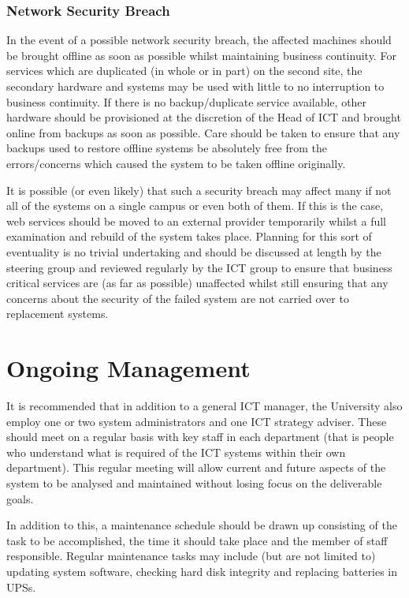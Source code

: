 \documentclass[a4paper, twoside]{article}
\begin{document}
\subsubsection{Network Security Breach}
In the event of a possible network security breach, the affected machines should
be brought offline as soon as possible whilst maintaining business continuity.
For services which are duplicated (in whole or in part) on the second site, the
secondary hardware and systems may be used with little to no interruption to
business continuity. If there is no backup/duplicate service available, other
hardware should be provisioned at the discretion of the Head of ICT and brought
online from backups as soon as possible. Care should be taken to ensure that any
backups used to restore offline systems be absolutely free from the
errors/concerns which caused the system to be taken offline originally.

It is possible (or even likely) that such a security breach may affect many if
not all of the systems on a single campus or even both of them. If this is the
case, web services should be moved to an external provider temporarily whilst a
full examination and rebuild of the system takes place. Planning for this sort
of eventuality is no trivial undertaking and should be discussed at length by
the steering group and reviewed regularly by the ICT group to ensure that
business critical services are (as far as possible) unaffected whilst still
ensuring that any concerns about the security of the failed system are not
carried over to replacement systems.

\section{Ongoing Management}
\label{sec:manage}
It is recommended that in addition to a general ICT manager, the University also
employ one or two system administrators and one ICT strategy adviser. These
should meet on a regular basis with key staff in each department (that is people
who understand what is required of the ICT systems within their own department).
This regular meeting will allow current and future aspects of the system to be
analysed and maintained without losing focus on the deliverable goals.

In addition to this, a maintenance schedule should be drawn up consisting of the
task to be accomplished, the time it should take place and the member of staff
responsible. Regular maintenance tasks may include (but are not limited to)
updating system software, checking hard disk integrity and replacing batteries
in UPSs.
\end{document}
